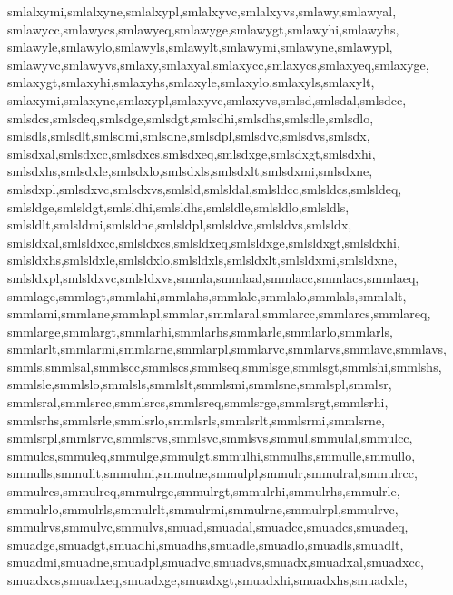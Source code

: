{{      smlalxymi,smlalxyne,smlalxypl,smlalxyvc,smlalxyvs,smlawy,smlawyal,      %
      smlawycc,smlawycs,smlawyeq,smlawyge,smlawygt,smlawyhi,smlawyhs,         %
      smlawyle,smlawylo,smlawyls,smlawylt,smlawymi,smlawyne,smlawypl,         %
      smlawyvc,smlawyvs,smlaxy,smlaxyal,smlaxycc,smlaxycs,smlaxyeq,smlaxyge,  %
      smlaxygt,smlaxyhi,smlaxyhs,smlaxyle,smlaxylo,smlaxyls,smlaxylt,         %
      smlaxymi,smlaxyne,smlaxypl,smlaxyvc,smlaxyvs,smlsd,smlsdal,smlsdcc,     %
      smlsdcs,smlsdeq,smlsdge,smlsdgt,smlsdhi,smlsdhs,smlsdle,smlsdlo,        %
      smlsdls,smlsdlt,smlsdmi,smlsdne,smlsdpl,smlsdvc,smlsdvs,smlsdx,         %
      smlsdxal,smlsdxcc,smlsdxcs,smlsdxeq,smlsdxge,smlsdxgt,smlsdxhi,         %
      smlsdxhs,smlsdxle,smlsdxlo,smlsdxls,smlsdxlt,smlsdxmi,smlsdxne,         %
      smlsdxpl,smlsdxvc,smlsdxvs,smlsld,smlsldal,smlsldcc,smlsldcs,smlsldeq,  %
      smlsldge,smlsldgt,smlsldhi,smlsldhs,smlsldle,smlsldlo,smlsldls,         %
      smlsldlt,smlsldmi,smlsldne,smlsldpl,smlsldvc,smlsldvs,smlsldx,          %
      smlsldxal,smlsldxcc,smlsldxcs,smlsldxeq,smlsldxge,smlsldxgt,smlsldxhi,  %
      smlsldxhs,smlsldxle,smlsldxlo,smlsldxls,smlsldxlt,smlsldxmi,smlsldxne,  %
      smlsldxpl,smlsldxvc,smlsldxvs,smmla,smmlaal,smmlacc,smmlacs,smmlaeq,    %
      smmlage,smmlagt,smmlahi,smmlahs,smmlale,smmlalo,smmlals,smmlalt,        %
      smmlami,smmlane,smmlapl,smmlar,smmlaral,smmlarcc,smmlarcs,smmlareq,     %
      smmlarge,smmlargt,smmlarhi,smmlarhs,smmlarle,smmlarlo,smmlarls,         %
      smmlarlt,smmlarmi,smmlarne,smmlarpl,smmlarvc,smmlarvs,smmlavc,smmlavs,  %
      smmls,smmlsal,smmlscc,smmlscs,smmlseq,smmlsge,smmlsgt,smmlshi,smmlshs,  %
      smmlsle,smmlslo,smmlsls,smmlslt,smmlsmi,smmlsne,smmlspl,smmlsr,         %
      smmlsral,smmlsrcc,smmlsrcs,smmlsreq,smmlsrge,smmlsrgt,smmlsrhi,         %
      smmlsrhs,smmlsrle,smmlsrlo,smmlsrls,smmlsrlt,smmlsrmi,smmlsrne,         %
      smmlsrpl,smmlsrvc,smmlsrvs,smmlsvc,smmlsvs,smmul,smmulal,smmulcc,       %
      smmulcs,smmuleq,smmulge,smmulgt,smmulhi,smmulhs,smmulle,smmullo,        %
      smmulls,smmullt,smmulmi,smmulne,smmulpl,smmulr,smmulral,smmulrcc,       %
      smmulrcs,smmulreq,smmulrge,smmulrgt,smmulrhi,smmulrhs,smmulrle,         %
      smmulrlo,smmulrls,smmulrlt,smmulrmi,smmulrne,smmulrpl,smmulrvc,         %
      smmulrvs,smmulvc,smmulvs,smuad,smuadal,smuadcc,smuadcs,smuadeq,         %
      smuadge,smuadgt,smuadhi,smuadhs,smuadle,smuadlo,smuadls,smuadlt,        %
      smuadmi,smuadne,smuadpl,smuadvc,smuadvs,smuadx,smuadxal,smuadxcc,       %
      smuadxcs,smuadxeq,smuadxge,smuadxgt,smuadxhi,smuadxhs,smuadxle,         %
}}
